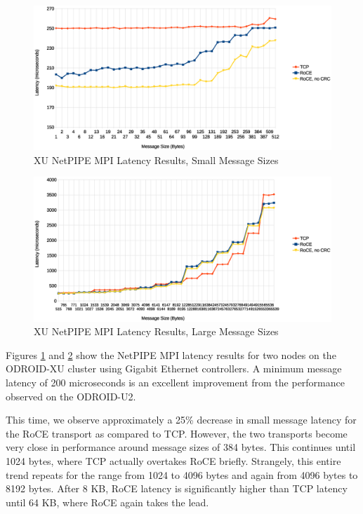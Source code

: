 \documentclass[11pt]{book}
\begin{document}
\begin{figure}
\includegraphics[width=\textwidth]{xu_lat_small}
\caption{XU NetPIPE MPI Latency Results, Small Message Sizes}
\label{xu-lat-small}
\end{figure}

\begin{figure}
\includegraphics[width=\textwidth]{xu_lat_large}
\caption{XU NetPIPE MPI Latency Results, Large Message Sizes}
\label{xu-lat-large}
\end{figure}

Figures \ref{xu-lat-small} and \ref{xu-lat-large} show the NetPIPE MPI latency results for
two nodes on the ODROID-XU cluster using Gigabit Ethernet controllers.  A minimum message
latency of 200 microseconds is an excellent improvement from the performance observed on
the ODROID-U2.

This time, we observe approximately a 25\% decrease in small message latency for the RoCE
transport as compared to TCP.  However, the two transports become very close in
performance around message sizes of 384 bytes.  This continues until 1024 bytes, where TCP
actually overtakes RoCE briefly.  Strangely, this entire trend repeats for the range from
1024 to 4096 bytes and again from 4096 bytes to 8192 bytes. After 8 KB, RoCE latency is
significantly higher than TCP latency until 64 KB, where RoCE again takes the lead.
\end{document}
